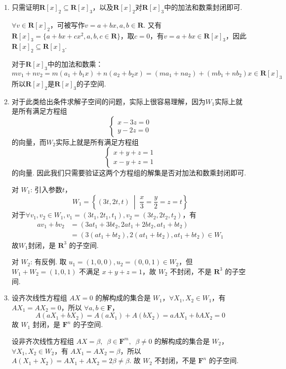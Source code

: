 \begin{solution}
    \begin{enumerate}
        \item 只需证明$\mathbf{R}[x]_2 \subseteq \mathbf{R}[x]_3$，以及$\mathbf{R}[x]_2$对$\mathbf{R}[x]_3$中的加法和数乘封闭即可.

              $\forall v \in \mathbf{R}[x]_2$，可被写作$v=a+bx,a,b \in \mathbf{R}$. 又有$\mathbf{R}[x]_3=\{a+bx+cx^2,a,b,c \in \mathbf{R}\}$，取$c=0$，有$v=a+bx \in \mathbf{R}[x]_3$，因此$\mathbf{R}[x]_2 \subseteq \mathbf{R}[x]_3$.

              对于$\mathbf{R}[x]_3$中的加法和数乘：
              \[mv_1+nv_2=m(a_1+b_1x)+n(a_2+b_2x)=(ma_1+na_2)+(mb_1+nb_2)x \in \mathbf{R}[x]_3\]
              所以$\mathbf{R}[x]_2$是$\mathbf{R}[x]_3$的子空间.

        \item 对于此类给出条件求解子空间的问题，实际上很容易理解，因为$W_1$实际上就是所有满足方程组
                \[\begin{cases}
                        x-3z=0 \\
                        y-2z=0
                    \end{cases}\]
                的向量，而$W_2$实际上就是所有满足方程组
                \[\begin{cases}
                        x+y+z=1 \\
                        x-y+z=1
                    \end{cases}\]
                的向量. 因此我们只需要验证这两个方程组的解集是否对加法和数乘封闭即可.

              对 $W_1$: 引入参数$t$，
              \[W_1=\left\{(3t,2t,t) \;\middle|\; \frac{x}{3} = \frac{y}{2} = z = t\right\}\]
              对于$\forall v_1, v_2 \in W_1, v_1 = (3t_1, 2t_1, t_1), v_2 = (3t_2, 2t_2, t_2)$，有
              \begin{align*}
                  av_1 + bv_2 & = (3at_1 + 3bt_2, 2at_1 + 2bt_2, at_1 + bt_2)           \\
                              & = (3(at_1 + bt_2), 2(at_1 + bt_2), at_1 + bt_2) \in W_1
              \end{align*}
              故$W_1$封闭，是 $\mathbf{R}^3$ 的子空间.

              对 $W_2$: 有反例. 取 $u_1 = (1, 0, 0), u_2 = (0, 0, 1) \in W_2$，但 $W_1 + W_2 = (1, 0, 1)$ 不满足 $x + y + z = 1$，故 $W_2$ 不封闭，不是 $\mathbf{R}^3$ 的子空间.

        \item 设齐次线性方程组 $AX=0$ 的解构成的集合是 $W_1$，$\forall X_1, X_2 \in W_1$，有 $AX_1 = AX_2 = 0$，所以 $\forall a, b \in \mathbf{F}$，
              \[A(a X_1 + b X_2) = A(a X_1) + A(b X_2) = a AX_1 + b AX_2 = 0\]
              故 $W_1$ 封闭，是 $\mathbf{F}^n$ 的子空间.

              设非齐次线性方程组 $AX = \beta,\enspace \beta \in \mathbf{F}^m,\enspace \beta \neq 0$ 的解构成的集合是 $W_2$，$\forall X_1, X_2 \in W_2$，有 $AX_1 = AX_2 = \beta$，所以 $A(X_1 + X_2) = AX_1 + AX_2 = 2\beta \neq \beta$. 故 $W_2$ 不封闭，不是 $\mathbf{F}^n$ 的子空间.
    \end{enumerate}
\end{solution}

